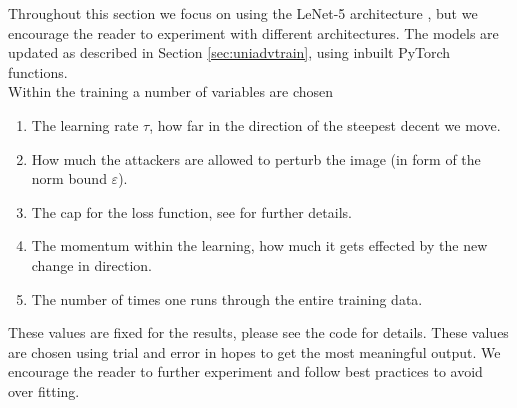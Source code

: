 


Throughout this section we focus on using the LeNet-5 architecture \cite{lecun1998gradient}, but we encourage the reader to experiment with different architectures. The models are updated as described in Section \ref{sec:uniadvtrain}, using inbuilt PyTorch functions.\\

Within the training a number of variables are chosen

\begin{enumerate}
	\item The learning rate $\tau$, how far in the direction of the steepest decent we move.
	\item How much the attackers are allowed to perturb the image (in form of the norm bound $\varepsilon$).
	\item The cap for the loss function, see \cite{shafahi_universal_2018} for further details.
	\item The momentum within the learning, how much it gets effected by the new change in direction.
	\item The number of times one runs through the entire training data.
\end{enumerate}

These values are fixed for the results, please see the code for details. These values are chosen using trial and error in hopes to get the most meaningful output. We encourage the reader to further experiment and follow best practices to avoid over fitting.


